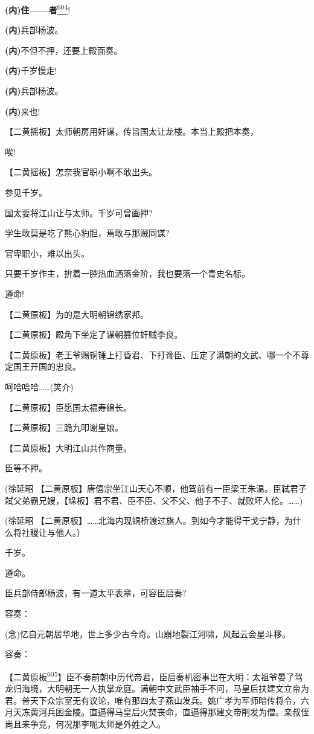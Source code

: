 \textbf{(内)住------者}\protect\hyperlink{fn604}{\textsuperscript{604}}!

\textbf{(内)}兵部杨波。

\textbf{(内)}不但不押，还要上殿面奏。

\textbf{(内)}千岁慢走!

\textbf{(内)}兵部杨波。

\textbf{(内)}来也!

【二黄摇板】太师朝房用奸谋，传旨国太让龙楼。本当上殿把本奏，

唉!

【二黄摇板】怎奈我官职小啊不敢出头。

参见千岁。

国太要将江山让与太师。千岁可曾画押?

学生敢莫是吃了熊心豹胆，焉敢与那贼同谋?

官卑职小，难以出头。

只要千岁作主，拚着一腔热血洒落金阶，我也要落一个青史名标。

遵命!

【二黄原板】为的是大明朝锦绣家邦。

【二黄原板】殿角下坐定了谋朝篡位奸贼李良。

【二黄原板】老王爷赐铜锤上打昏君、下打谗臣、压定了满朝的文武、哪一个不尊定国王开国的忠良。

呵哈哈哈\ldots{}\ldots{}(笑介)

【二黄原板】臣愿国太福寿绵长。

【二黄原板】三跪九叩谢皇娘。

【二黄原板】大明江山共作商量。

臣等不押。

(徐延昭
【二黄原板】唐僖宗坐江山天心不顺，他驾前有一臣梁王朱温。臣弑君子弑父弟霸兄嫂，【垛板】君不君、臣不臣、父不父、他子不子、就败坏人伦。\ldots{}\ldots{})

(徐延昭
【二黄原板】\ldots{}\ldots{}北海内现铜桥渡过旗人。到如今才能得干戈宁静，为什么将社稷让与他人。）

千岁。

遵命。

臣兵部侍郎杨波，有一道太平表章，可容臣启奏?

容奏：

(念)忆自元朝居华地，世上多少古今奇。山崩地裂江河啸，风起云会星斗移。

容奏：

【二黄原板\protect\hyperlink{fn605}{\textsuperscript{605}}】臣不奏前朝中历代帝君，臣启奏机密事出在大明：太祖爷晏了驾龙归海境，大明朝无一人执掌龙庭。满朝中文武臣袖手不问，马皇后扶建文立帝为君。普天下众宗室无有议论，唯有那四太子燕山发兵。姚广孝为军师暗传将令，六月天冻黄河兵困金陵。直逼得马皇后火焚丧命，直逼得那建文帝削发为僧。亲叔侄尚且来争竞，何况那李呃太师是外姓之人。

